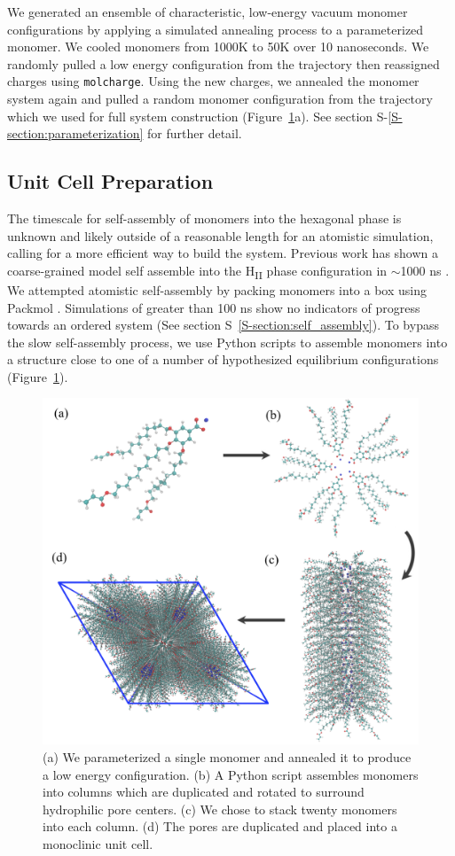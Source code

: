 \documentclass[journal=jpcbfk,manusciprt=article]{achemso}
\begin{document}
  We generated an ensemble of characteristic, low-energy vacuum monomer
  configurations by applying a simulated annealing process to a
  parameterized monomer. We cooled monomers from 1000K to 50K over 10
  nanoseconds. We randomly pulled a low energy configuration from the
  trajectory then reassigned charges using \texttt{molcharge}. Using the new
  charges, we annealed the monomer system again and pulled a random monomer
  configuration from the trajectory which we used for full system
  construction (Figure~\ref{fig:python}a). See section S-\ref{S-section:parameterization} 
  for further detail.

  \subsection{Unit Cell Preparation}

  The timescale for self-assembly of monomers into the hexagonal phase is
  unknown and likely outside of a reasonable length for an atomistic simulation,
  calling for a more efficient way to build the system. Previous work has shown
  a coarse-grained model self assemble into the H\textsubscript{II} phase
  configuration in $\sim$1000 ns \cite{mondal_self-assembly_2013}.  We
  attempted atomistic self-assembly by packing monomers into a box using Packmol
  \cite{martinez_packmol:_2009}. Simulations of greater than 100 ns show no
  indicators of progress towards an ordered system (See section S~\ref{S-section:self_assembly}). 
  To bypass the slow self-assembly process, we use Python scripts to assemble monomers
  into a structure close to one of a number of hypothesized equilibrium configurations
  (Figure~\ref{fig:python}).
  
  \begin{figure}
	\centering
	\includegraphics[width=0.75\linewidth]{build.PNG} %
	\caption{(a) We parameterized a single monomer and annealed it to produce a low energy
		configuration. (b) A Python script assembles monomers into columns which are duplicated 
		and rotated to surround hydrophilic pore centers. (c) We chose to stack twenty monomers
		into each column. (d) The pores are duplicated and placed into a monoclinic unit cell.}\label{fig:python}
  \end{figure}
  
\end{document}
